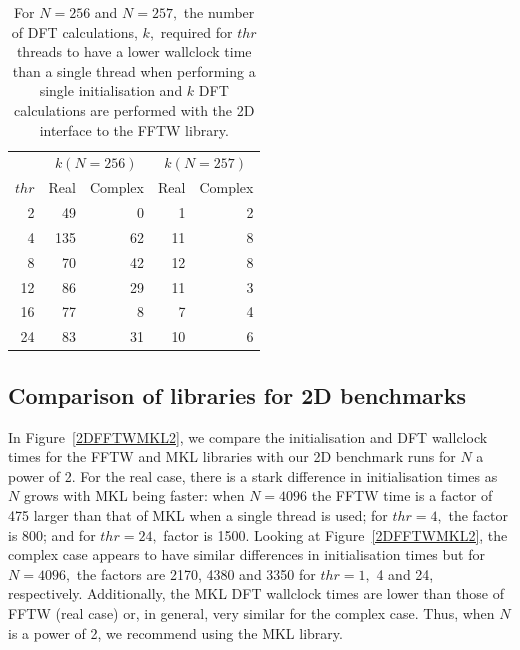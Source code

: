 \documentclass[a4paper]{article}
\begin{document}
\begin{table}
\begin{center}
\begin{tabular}{|r||r|r||r|r|}
  \hline
 & \multicolumn{2}{|c||}{$k(N=256)$} & \multicolumn{2}{|c|}{$k(N=257)$} \\
$thr$ &  Real & Complex &  Real & Complex  \\ \hline
  2 & 49 & 0   &  1 & 2 \\
  4 & 135 & 62 & 11 & 8 \\
  8 & 70 & 42 & 12 & 8 \\
  12 & 86 & 29 & 11 & 3 \\
  16 & 77 & 8  & 7 & 4 \\
  24 & 83 & 31 &10 & 6  \\ \hline
\end{tabular}
\caption{ For $N=256$ and $N=257,$ the number of DFT calculations, $k,$ required for $thr$ threads to have a lower wallclock time than a single thread when performing  a single initialisation and $k$ DFT calculations are performed with the 2D interface to the FFTW library.  }\label{Tbl:MKL2dk}
\end{center}
\end{table}

\subsection{Comparison of libraries for 2D benchmarks}\label{Sec:2DComp}

In Figure~\ref{2DFFTWMKL2}, we compare the initialisation and DFT
wallclock times for the FFTW and MKL libraries with our 2D benchmark
runs for $N$ a power of 2. For the real case, there is a stark
difference in initialisation times as $N$ grows with MKL being faster:
when $N=4096$ the FFTW time is a factor of 475 larger than that of MKL
when a single thread is used; for $thr=4,$ the factor is 800; and for
$thr=24,$ factor is 1500. Looking at Figure~\ref{2DFFTWMKL2}, the
complex case appears to have similar differences in initialisation
times but for $N=4096,$ the factors are 2170, 4380 and 3350 for
$thr=1,$ 4 and 24, respectively. Additionally, the MKL DFT wallclock
times are lower than those of FFTW (real case) or, in general, very
similar for the complex case. Thus, when $N$ is a power of 2, we
recommend using the MKL library.
\end{document}
